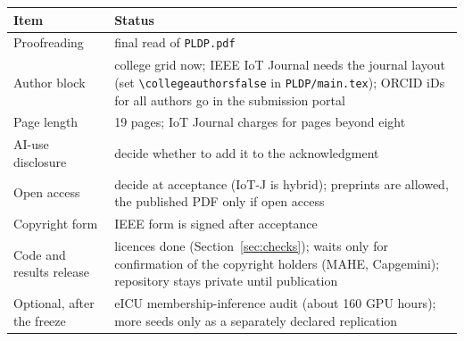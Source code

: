 \documentclass[11pt,a4paper]{article}
\begin{document}
\begin{center}
\small
\begin{tabular}{P{0.38\textwidth} P{0.55\textwidth}}
\toprule
Item & Status \\
\midrule
Proofreading & final read of \texttt{PLDP.pdf} \\
Author block & college grid now; IEEE IoT Journal needs the journal layout (set \texttt{\textbackslash collegeauthorsfalse} in \texttt{PLDP/main.tex}); ORCID iDs for all authors go in the submission portal \\
Page length & 19 pages; IoT Journal charges for pages beyond eight \\
AI-use disclosure & decide whether to add it to the acknowledgment \\
Open access & decide at acceptance (IoT-J is hybrid); preprints are allowed, the published PDF only if open access \\
Copyright form & IEEE form is signed after acceptance \\
Code and results release & licences done (Section~\ref{sec:checks}); waits only for confirmation of the copyright holders (MAHE, Capgemini); repository stays private until publication \\
Optional, after the freeze & eICU membership-inference audit (about 160 GPU hours); more seeds only as a separately declared replication \\
\bottomrule
\end{tabular}
\end{center}

\end{document}
